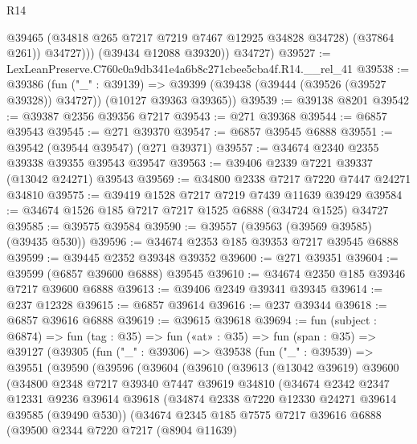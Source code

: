 \begin{lexlean}{R14}
\begin{coremodule}
                @39465
                (@34818 @265 @7217 @7219 @7467 @12925 @34828 @34728)
                (@37864 @261))
              @34727)))
        (@39434 @12088 @39320))
      @34727)
@39527 := LexLeanPreserve.C760c0a9db341e4a6b8c271cbee5cba4f.R14.__rel_41
@39538 := @39386
    (fun ("_" : @39139) =>
    @39399 (@39438 (@39444 (@39526 (@39527 @39328)) @34727)) (@10127 @39363 @39365))
@39539 := @39138 @8201
@39542 := @39387 @2356 @39356 @7217
@39543 := @271 @39368
@39544 := @6857 @39543
@39545 := @271 @39370
@39547 := @6857 @39545 @6888
@39551 := @39542 (@39544 @39547) (@271 @39371)
@39557 := @34674 @2340 @2355 @39338 @39355 @39543 @39547
@39563 := @39406 @2339 @7221 @39337 (@13042 @24271) @39543
@39569 := @34800 @2338 @7217 @7220 @7447 @24271 @34810
@39575 := @39419 @1528 @7217 @7219 @7439 @11639 @39429
@39584 := @34674 @1526 @185 @7217 @7217 @1525 @6888 (@34724 @1525) @34727
@39585 := @39575 @39584
@39590 := @39557 (@39563 (@39569 @39585) (@39435 @530))
@39596 := @34674 @2353 @185 @39353 @7217 @39545 @6888
@39599 := @39445 @2352 @39348 @39352
@39600 := @271 @39351
@39604 := @39599 (@6857 @39600 @6888) @39545
@39610 := @34674 @2350 @185 @39346 @7217 @39600 @6888
@39613 := @39406 @2349 @39341 @39345
@39614 := @237 @12328
@39615 := @6857 @39614
@39616 := @237 @39344
@39618 := @6857 @39616 @6888
@39619 := @39615 @39618
@39694 := fun (subject : @6874) =>
  fun (tag : @35) =>
  fun («at» : @35) =>
  fun (span : @35) =>
  @39127
    (@39305
      (fun ("_" : @39306) =>
      @39538
        (fun ("_" : @39539) =>
        @39551
          (@39590
            (@39596
              (@39604
                (@39610
                  (@39613
                    (@13042 @39619)
                    @39600
                    (@34800
                      @2348
                      @7217
                      @39340
                      @7447
                      @39619
                      @34810
                      (@34674
                        @2342
                        @2347
                        @12331
                        @9236
                        @39614
                        @39618
                        (@34874 @2338 @7220 @12330 @24271 @39614 @39585 (@39490 @530))
                        (@34674
                          @2345
                          @185
                          @7575
                          @7217
                          @39616
                          @6888
                          (@39500
                            @2344
                            @7220
                            @7217
                            (@8904 @11639)

\end{coremodule}
\end{lexlean}
